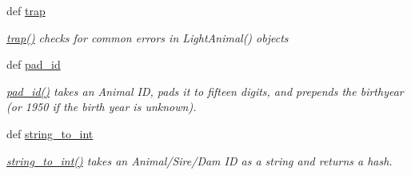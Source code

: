 \begin{DoxyCompactItemize}
def \hyperlink{classPyPedal_1_1pyp__newclasses_1_1LightAnimal_aaa37d1871c1611ed2eb0a20c89886339}{trap}
\begin{DoxyCompactList}\small\item\em \hyperlink{classPyPedal_1_1pyp__newclasses_1_1LightAnimal_aaa37d1871c1611ed2eb0a20c89886339}{trap()} checks for common errors in LightAnimal() objects \end{DoxyCompactList}\item 
def \hyperlink{classPyPedal_1_1pyp__newclasses_1_1LightAnimal_ae7811b64c92921123f64ae6cac0568da}{pad\_\-id}
\begin{DoxyCompactList}\small\item\em \hyperlink{classPyPedal_1_1pyp__newclasses_1_1LightAnimal_ae7811b64c92921123f64ae6cac0568da}{pad\_\-id()} takes an Animal ID, pads it to fifteen digits, and prepends the birthyear (or 1950 if the birth year is unknown). \end{DoxyCompactList}\item 
def \hyperlink{classPyPedal_1_1pyp__newclasses_1_1LightAnimal_aa45130d80a969ddccf4ce5ccc68a4932}{string\_\-to\_\-int}
\begin{DoxyCompactList}\small\item\em \hyperlink{classPyPedal_1_1pyp__newclasses_1_1LightAnimal_aa45130d80a969ddccf4ce5ccc68a4932}{string\_\-to\_\-int()} takes an Animal/Sire/Dam ID as a string and returns a hash. \end{DoxyCompactList}\end{DoxyCompactItemize}
